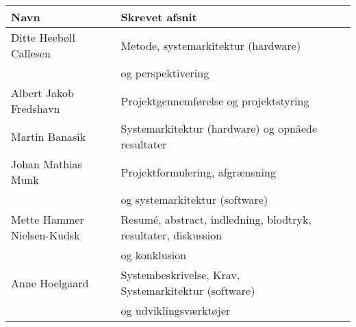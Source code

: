 \begin{longtabu} to 
    Navn &    Skrevet afsnit &\\[-1ex]
    \midrule
    Ditte Heebøll Callesen & Metode, systemarkitektur (hardware) & \\
     & og perspektivering & \\
    Albert Jakob Fredshavn &  Projektgennemførelse og projektstyring & \\
    Martin Banasik         & Systemarkitektur (hardware) og opnåede resultater & \\
    Johan Mathias Munk     & Projektformulering, afgrænsning &  \\ & og systemarkitektur (software) & \\
    Mette Hammer Nielsen-Kudsk & Resumé, abstract, indledning, blodtryk, resultater, diskussion &  \\
     & og konklusion &  \\
   	Anne Hoelgaard   	 	& Systembeskrivelse, Krav, Systemarkitektur (software) & \\ & og udviklingsværktøjer & \\
\end{longtabu}

